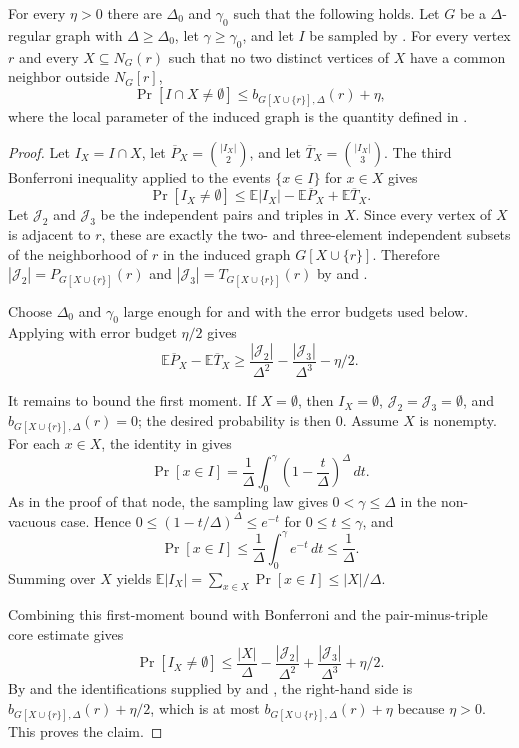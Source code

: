 \begin{lemma}
For every $\eta>0$ there are $\Delta_0$ and $\gamma_0$ such that the
following holds.  Let $G$ be a $\Delta$-regular graph with
$\Delta\ge\Delta_0$, let $\gamma\ge\gamma_0$, and let $I$ be sampled by
.  For every vertex $r$ and every
$X\subseteq N_G(r)$ such that no two distinct vertices of $X$ have a common
neighbor outside $N_G[r]$,
\[
\Pr[I\cap X\ne\emptyset]\le b_{G[X\cup\{r\}],\Delta}(r)+\eta ,
\]
where the local parameter of the induced graph is the quantity defined in
.
\end{lemma}
\begin{proof}
Let $I_X=I\cap X$, let
$\overline P_X=\binom{|I_X|}{2}$, and let
$\overline T_X=\binom{|I_X|}{3}$.  The third Bonferroni inequality applied
to the events $\{x\in I\}$ for $x\in X$ gives
\[
\Pr[I_X\ne\emptyset]
\le \mathbb E|I_X|-\mathbb E\overline P_X+\mathbb E\overline T_X .
\]
Let $\mathcal J_2$ and $\mathcal J_3$ be the independent pairs and triples in
$X$.  Since every vertex of $X$ is adjacent to $r$, these are exactly the
two- and three-element independent subsets of the neighborhood of $r$ in the
induced graph $G[X\cup\{r\}]$.  Therefore
$|\mathcal J_2|=P_{G[X\cup\{r\}]}(r)$ and
$|\mathcal J_3|=T_{G[X\cup\{r\}]}(r)$ by
 and .

Choose $\Delta_0$ and $\gamma_0$ large enough for
 and
 with the error budgets used below.
Applying  with error budget
$\eta/2$ gives
\[
\mathbb E\overline P_X-\mathbb E\overline T_X
\ge
\frac{|\mathcal J_2|}{\Delta^2}
-\frac{|\mathcal J_3|}{\Delta^3}
-\eta/2 .
\]

It remains to bound the first moment.  If $X=\emptyset$, then
$I_X=\emptyset$, $\mathcal J_2=\mathcal J_3=\emptyset$, and
$b_{G[X\cup\{r\}],\Delta}(r)=0$; the desired probability is then $0$.
Assume $X$ is nonempty.  For each $x\in X$, the identity in
 gives
\[
\Pr[x\in I]
=\frac1\Delta\int_0^\gamma \left(1-\frac t\Delta\right)^\Delta\,dt .
\]
As in the proof of that node, the sampling law gives $0<\gamma\le\Delta$ in
the non-vacuous case.  Hence
$0\le(1-t/\Delta)^\Delta\le e^{-t}$ for $0\le t\le\gamma$, and
\[
\Pr[x\in I]\le
\frac1\Delta\int_0^\gamma e^{-t}\,dt
\le\frac1\Delta .
\]
Summing over $X$ yields
$\mathbb E|I_X|=\sum_{x\in X}\Pr[x\in I]\le |X|/\Delta$.

Combining this first-moment bound with Bonferroni and the pair-minus-triple
core estimate gives
\[
\Pr[I_X\ne\emptyset]\le
\frac{|X|}{\Delta}-\frac{|\mathcal J_2|}{\Delta^2}
+\frac{|\mathcal J_3|}{\Delta^3}+\eta/2 .
\]
By  and the identifications supplied by
 and , the
right-hand side is
$b_{G[X\cup\{r\}],\Delta}(r)+\eta/2$, which is at most
$b_{G[X\cup\{r\}],\Delta}(r)+\eta$ because $\eta>0$.  This proves the
claim.
\end{proof}
